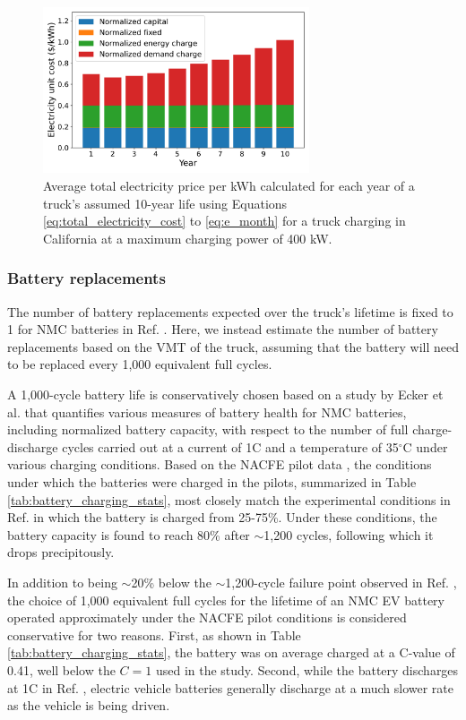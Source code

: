 \begin{figure}[H]
        \centering
        \includegraphics[width=0.7\textwidth]{figures/electricity_unit_price_CA.pdf}
        \caption{Average total electricity price per kWh calculated for each year of a truck's assumed 10-year life using Equations \ref{eq:total_electricity_cost} to \ref{eq:e_month} for a truck charging in California at a maximum charging power of 400 kW. } 
        \label{fig:energy_cost_by_year}
\end{figure}

\subsubsection{Battery replacements}
\label{sec:battery_replacement}

The number of battery replacements expected over the truck's lifetime is fixed to 1 for NMC batteries in Ref. \cite{Sader_2023}. Here, we instead estimate the number of battery replacements based on the VMT of the truck, assuming that the battery will need to be replaced every 1,000 equivalent full cycles. 

A 1,000-cycle battery life is conservatively chosen based on a study by Ecker et al. \cite{Ecker_2014} that quantifies various measures of battery health for NMC batteries, including normalized battery capacity, with respect to the number of full charge-discharge cycles carried out at a current of 1C and a temperature of 35$^{\circ}$C under various charging conditions. Based on the NACFE pilot data \cite{NACFE_2023}, the conditions under which the batteries were charged in the pilots, summarized in Table \ref{tab:battery_charging_stats}, most closely match the experimental conditions in Ref. \cite{Ecker_2014} in which the battery is charged from 25-75\%. Under these conditions, the battery capacity is found to reach 80\% after $\sim$1,200 cycles, following which it drops precipitously. 

In addition to being $\sim$20\% below the $\sim$1,200-cycle failure point observed in Ref. \cite{Ecker_2014}, the choice of 1,000 equivalent full cycles for the lifetime of an NMC EV battery operated approximately under the NACFE pilot conditions is considered conservative for two reasons. First, as shown in Table \ref{tab:battery_charging_stats}, the battery was on average charged at a C-value of 0.41, well below the $C=1$ used in the study. Second, while the battery discharges at 1C in Ref. \cite{Ecker_2014}, electric vehicle batteries generally discharge at a much slower rate as the vehicle is being driven. 

